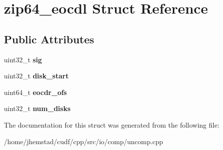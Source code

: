 \hypertarget{structzip64__eocdl}{}\section{zip64\+\_\+eocdl Struct Reference}
\label{structzip64__eocdl}
\subsection*{Public Attributes}
\begin{DoxyCompactItemize}
\item 
uint32\+\_\+t {\bfseries sig}\hypertarget{structzip64__eocdl_a956a737eb098b28871816ec937692047}{}\label{structzip64__eocdl_a956a737eb098b28871816ec937692047}

\item 
uint32\+\_\+t {\bfseries disk\+\_\+start}\hypertarget{structzip64__eocdl_a59e16a26d97d3d21c8f990d1f7e894fa}{}\label{structzip64__eocdl_a59e16a26d97d3d21c8f990d1f7e894fa}

\item 
uint64\+\_\+t {\bfseries eocdr\+\_\+ofs}\hypertarget{structzip64__eocdl_ad65b349bbc456b5495d53742f180aac2}{}\label{structzip64__eocdl_ad65b349bbc456b5495d53742f180aac2}

\item 
uint32\+\_\+t {\bfseries num\+\_\+disks}\hypertarget{structzip64__eocdl_a3598424046ec3882e96d49b3671fe86b}{}\label{structzip64__eocdl_a3598424046ec3882e96d49b3671fe86b}

\end{DoxyCompactItemize}


The documentation for this struct was generated from the following file\+:\begin{DoxyCompactItemize}
\item 
/home/jhemstad/cudf/cpp/src/io/comp/uncomp.\+cpp\end{DoxyCompactItemize}
